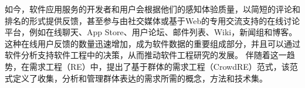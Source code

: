 


如今，软件应用服务的开发者和用户会根据他们的感知体验质量，以简短的评论和排名的形式提供反馈，甚至参与由社交媒体或基于Web的专用交流支持的在线讨论平台，例如在线聊天、App Store、用户论坛、邮件列表、Wiki，新闻组和博客。 这种在线用户反馈的数量迅速增加，成为软件数据的重要组成部分，并且可以通过软件分析支持软件工程中的决策，从而推动软件工程研究的发展\cite{Morales2019Speech}。 
伴随着这一趋势，在需求工程（RE）中，提出了基于群体的需求工程（CrowdRE）\cite{groen2017crowd}范式，该范式定义了收集，分析和管理群体表达的需求所需的概念，方法和技术集。


